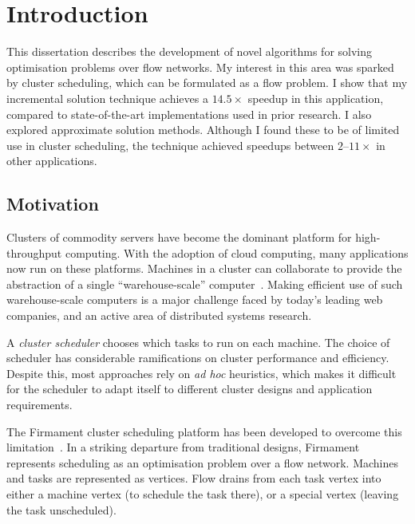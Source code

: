 \chapter{Introduction} \label{chap:intro}


This dissertation describes the development of novel algorithms for solving optimisation problems over flow networks. My interest in this area was sparked by cluster scheduling, which can be formulated as a flow problem. I show that my incremental solution technique achieves a $14.5\times$ speedup in this application, compared to state-of-the-art implementations used in prior research. I also explored approximate solution methods. Although I found these to be of limited use in cluster scheduling, the technique achieved speedups between $2\text{--}11\times$ in other applications.

\section{Motivation} \label{sec:intro-motivation}
Clusters of commodity servers have become the dominant platform for high-throughput computing. With the adoption of cloud computing, many applications now run on these platforms. Machines in a cluster can collaborate to provide the abstraction of a single ``warehouse-scale'' computer~\cite{WarehouseScale:2009}. Making efficient use of such warehouse-scale computers is a major challenge faced by today's leading web companies, and an active area of distributed systems research.

A \emph{cluster scheduler} chooses which tasks to run on each machine. The choice of scheduler has considerable ramifications on cluster performance and efficiency. Despite this, most approaches rely on \emph{ad hoc} heuristics, which makes it difficult for the scheduler to adapt itself to different cluster designs and application requirements.

The Firmament cluster scheduling platform has been developed to overcome this limitation\footnotemark~\cite[ch.~5]{Schwarzkopf:2015}. In a striking departure from traditional designs, Firmament represents scheduling as an optimisation problem over a flow network. Machines and tasks are represented as vertices. Flow drains from each task vertex into either a machine vertex (to schedule the task there), or a special vertex (leaving the task unscheduled).


